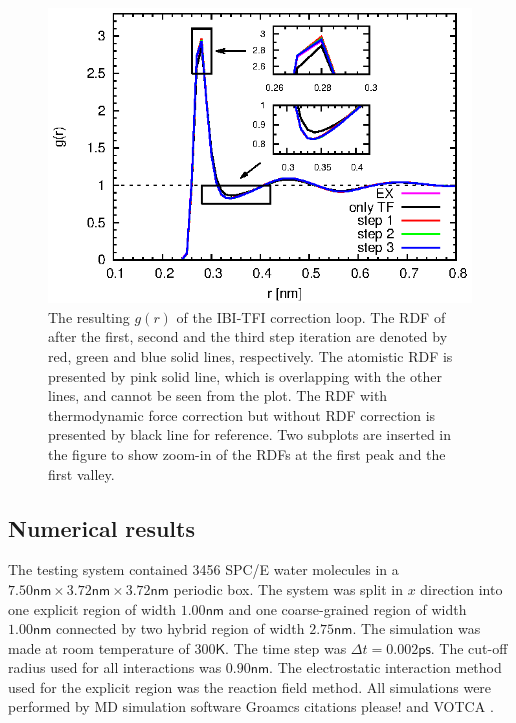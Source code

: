 \documentclass[aps,pre,preprint,unsortedaddress]{revtex4}
\newcommand{\redc}[1]{{\color{red} #1}}
\begin{document}
\begin{figure}
  \centering
  \includegraphics{fig.2/rdf.eps}
  \caption{The resulting $g(r)$ of the IBI-TFI correction loop.  The
    RDF of after the first, second and the third step iteration are
    denoted by red, green and blue solid lines, respectively.  The
    atomistic RDF is presented by pink solid line, which is
    overlapping with the other lines, and cannot be seen from the
    plot. The RDF with thermodynamic force correction but without RDF
    correction is presented by black line for reference. Two subplots
    are inserted in the figure to show zoom-in of the RDFs at the
    first peak and the first valley.}
  \label{fig:tmp4}
\end{figure}


\subsection{Numerical results}

The testing system contained 3456 SPC/E \cite{berendsen1987missing}
water molecules in a $7.50\textsf{nm}\times 3.72\textsf{nm}\times
3.72\textsf{nm}$ periodic box. The system was split in $x$ direction
into one explicit region of width $1.00\textsf{nm}$ and one
coarse-grained region of width $1.00\textsf{nm}$ connected by two
hybrid region of width $2.75\textsf{nm}$. The simulation was made at
room temperature of $300\textsf{K}$. The time step was $\Delta t =
0.002\textsf{ps}$. The cut-off radius used for all interactions was
$0.90\textsf{nm}$. The electrostatic interaction method used for the
explicit region was the reaction field method. All simulations were
performed by MD simulation software Groamcs \redc{citations please!}
and VOTCA \cite{ruehle2009versatile}.
\end{document}
